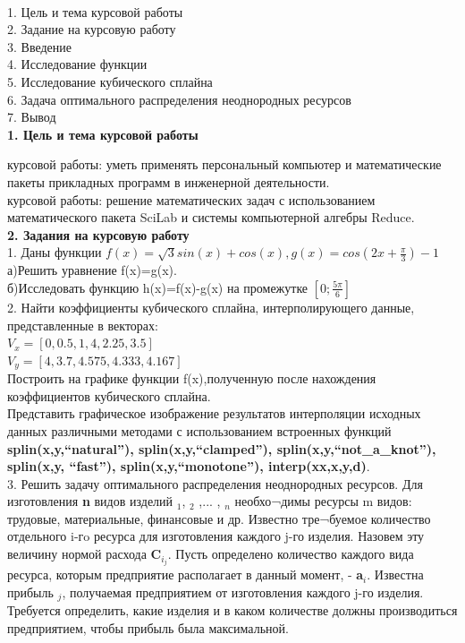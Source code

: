 \documentclass[russian,utf8,nocolumnxxxi,nocolumnxxxii]{eskdtext}
\begin{document}
{}\\
1. Цель и тема курсовой работы\\
2. Задание на курсовую работу\\
3. Введение\\
4. Исследование функции\\
5. Исследование кубического сплайна\\
6. Задача оптимального распределения неоднородных ресурсов\\
7. Вывод\\
\newpage
 {\large\bf 1. Цель и тема курсовой работы}

{ курсовой работы:} уметь применять персональный компьютер и математические пакеты прикладных программ в инженерной деятельности.\\
{ курсовой работы:} решение математических задач с использованием математического пакета SciLab и системы компьютерной алгебры Reduce.\\
\newpage
{\large\bf2. Задания на курсовую работу}\\
1. Даны функции $f(x)=\sqrt{3}sin(x)+cos(x),g(x)=cos(2x+\frac{\pi}{3})-1$\\
а)Решить уравнение f(x)=g(x).\\
б)Исследовать функцию h(x)=f(x)-g(x) на промежутке $[0;\frac{5\pi}{6}]$\\
2. Найти коэффициенты кубического сплайна, интерполирующего данные, представленные в векторах:\\
$V_{x}=[0,0.5,1,4,2.25,3.5]$\\
$V_{y}=[4,3.7,4.575,4.333,4.167]$\\
Построить на графике функции f(x),полученную после нахождения коэффициентов кубического сплайна. \\
Представить графическое изображение результатов интерполяции исходных данных различными методами с использованием встроенных функций\\{\bf splin(x,y,“natural”), splin(x,y,“clamped”), splin(x,y,“not\_a\_knot”),\\ splin(x,y, “fast”), splin(x,y,“monotone”), interp(xx,x,y,d)}.\\
3. Решить задачу оптимального распределения неоднородных ресурсов.
Для изготовления {\bf n} видов изделий {$_1$}, {$_2$} ,... , {$_n$} необхо¬димы ресурсы m видов: трудовые, материальные, финансовые и др. Известно тре¬буемое количество отдельного i-гo ресурса для изготовления каждого j-го изделия. Назовем эту величину нормой расхода {\bf C$_i_j$}. Пусть определено количество каждого вида ресурса, которым предприятие располагает в данный момент, - {\bf a$_i$}. Известна прибыль {$_j$}, получаемая предприятием от изготовления каждого j-го изделия. Требуется определить, какие изделия и в каком количестве должны производиться предприятием, чтобы прибыль была максимальной. 
\end{document}
